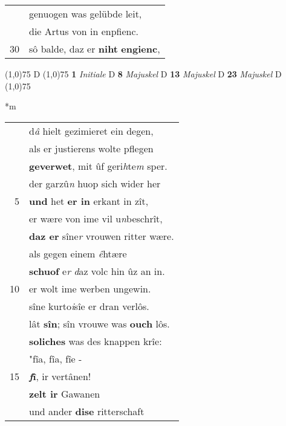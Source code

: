\documentclass[8pt,a4paper,notitlepage]{article}
\begin{document}
\begin{table}[ht]
\begin{minipage}[t]{0.5\linewidth}
\begin{tabular}{rl}
 & genuogen was gelübde leit,\\ 
 & die Artus von in enpfienc.\\ 
30 & sô balde, daz er \textbf{niht} \textbf{engienc},\\ 
\end{tabular}
\scriptsize
\line(1,0){75} \newline
D \newline
\line(1,0){75} \newline
\textbf{1} \textit{Initiale} D  \textbf{8} \textit{Majuskel} D  \textbf{13} \textit{Majuskel} D  \textbf{23} \textit{Majuskel} D  \newline
\line(1,0){75} \newline
\newline
\end{minipage}
\hspace{0.5cm}
\begin{minipage}[t]{0.5\linewidth}
\small
\begin{center}*m
\end{center}
\begin{tabular}{rl}
 & d\textit{â} hielt gezimieret ein degen,\\ 
 & als er justierens wolte pflegen\\ 
 & \textbf{geverwet}, mit ûf geri\textit{h}te\textit{m} sper.\\ 
 & der garzû\textit{n} huop sich wider her\\ 
5 & \textbf{und} het \textbf{er in} erkant in zît,\\ 
 & er wære von ime vil u\textit{n}beschrît,\\ 
 & \textbf{daz er} sîne\textit{r} vrouwen ritter wære.\\ 
 & als gegen einem \textit{ê}htære\\ 
 & \textbf{schuof} e\textit{r} \textit{d}az volc hin ûz an in.\\ 
10 & er wolt ime werben ungewin.\\ 
 & sîne kurto\textit{i}sîe er dran verlôs.\\ 
 & lât \textbf{sîn}; sîn vrouwe was \textbf{ouch} lôs.\\ 
 & \textbf{soliches} was des knappen krîe:\\ 
 & "fîa, fîa, fîe -\\ 
15 & \textbf{\textit{f}î}, ir vertânen!\\ 
 & \textbf{zelt ir} Gawanen\\ 
 & und ander \textbf{dise} ritterschaft\\ 

\end{tabular}
\end{minipage}
\end{table}
\end{document}
